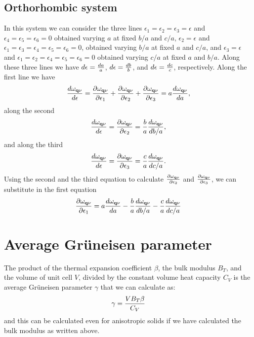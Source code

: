 \documentclass[12pt,a4paper]{article}
\begin{document}
\subsection{\color{web-blue}Orthorhombic system}
In this system we can consider the three lines 
$\epsilon_1=\epsilon_2=\epsilon_3=\epsilon$ and
$\epsilon_4=\epsilon_5 =\epsilon_6=0$ obtained varying $a$ at fixed
$b/a$ and $c/a$, 
$\epsilon_2=\epsilon$ and
$\epsilon_1=\epsilon_3=\epsilon_4=\epsilon_5 =\epsilon_6=0$, 
obtained varying $b/a$ at fixed $a$ and $c/a$,
and 
$\epsilon_3=\epsilon$ and
$\epsilon_1=\epsilon_2=\epsilon_4=\epsilon_5 =\epsilon_6=0$
obtained varying $c/a$ at fixed $a$ and $b/a$.
Along these three lines we have $d\epsilon={da \over a}$, 
$d\epsilon={db \over b}$, and $d\epsilon={dc \over c}$, respectively.
Along the first line we have
\begin{equation}
{d \omega_{{\bf q}\nu} \over d \epsilon} = {\partial \omega_{{\bf q}\nu} 
\over \partial \epsilon_1} + {\partial \omega_{{\bf q}\nu} 
\over \partial \epsilon_2} + {\partial \omega_{{\bf q}\nu} 
\over \partial \epsilon_3} = a {d \omega_{{\bf q}\nu} 
\over d a},
\end{equation}
along the second
\begin{equation}
{d \omega_{{\bf q}\nu} \over d \epsilon} = {\partial \omega_{{\bf q}\nu} 
\over \partial \epsilon_2} = {b\over a} {d \omega_{{\bf q}\nu} 
\over d b/a},
\end{equation}
and along the third
\begin{equation}
{d \omega_{{\bf q}\nu} \over d \epsilon} = {\partial \omega_{{\bf q}\nu} 
\over \partial \epsilon_3} = {c\over a} {d \omega_{{\bf q}\nu} 
\over d c/a}.
\end{equation}
Using the second and the third equation to calculate 
${\partial \omega_{{\bf q}\nu} \over \partial \epsilon_2}$ and
${\partial \omega_{{\bf q}\nu} \over \partial \epsilon_3}$, we can
substitute in the first equation
\begin{equation}
{\partial \omega_{{\bf q}\nu} \over \partial \epsilon_1} 
 = a {d \omega_{{\bf q}\nu} \over da} - {b\over a} {d \omega_{{\bf q}\nu} 
\over d b/a} - {c\over a} {d \omega_{{\bf q}\nu} 
\over d c/a}
\end{equation}

\newpage
\section{\color{coral}Average Gr\"uneisen parameter}

The product of the thermal expansion coefficient $\beta$, the bulk modulus
$B_T$, and the volume of unit cell $V$, divided by the constant volume
heat capacity $C_V$ is the average Gr\"uneisen parameter $\gamma$
that we can calculate as:
\begin{equation}
\gamma = {V B_T \beta \over C_V}
\end{equation}
and this can be calculated even for anisotropic solids if we have
calculated the bulk modulus as written above.
\end{document}

